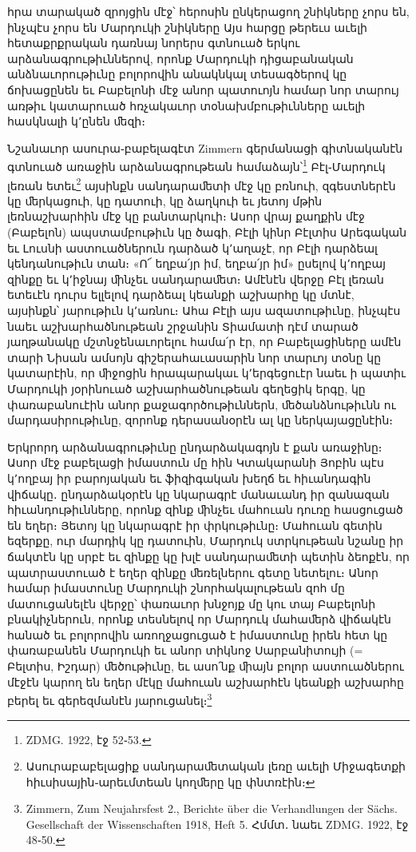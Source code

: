 \documentclass{article}
\begin{document}
{հրա տարակած զրոյցին մէջ՝ հերոսին ընկերացող շնիկները չորս են, ինչպէս չորս են Մարդուկի շնիկները Այս հարցը թերեւս աւելի հետաքրքրական դառնայ նորերս գտնուած երկու արձանագրութիւններով, որոնք Մարդուկի դիցաբանական անձնաւորութիւնը բոլորովին անակնկալ տեսագծերով կը ճոխացընեն եւ Բաբելոնի մէջ անոր պատուոյն համար նոր տարույ առթիւ կատարուած հռչակաւոր տօնախմբութիւնները աւելի հասկնալի կ՚ընեն ﬔզի։

Նշանաւոր ասուրա֊բաբելագէտ Zimmern գերմանացի գիտնականէն գտնուած առաջին արձանագրութեան համաձայն՝\footnote{ZDMG. 1922, էջ 52֊53.} Բէլ֊Մարդուկ լեռան ետեւ\footnote{Ասուրաբաբելացիք սանդարաﬔտական լեռը աւելի Միջագետքի հիւսիսային֊արեւմտեան կողﬔրը կը փնտռէին։} այսինքն սանդարաﬔտի մէջ կը բռնուի, զգեստներէն կը ﬔրկացուի, կը դատուի, կը ձաղկուի եւ յետոյ մթին լեռնաշխարհին մէջ կը բանտարկուի։ Ասոր վրայ քաղքին մէջ (Բաբելոն) ապստամբութիւն կը ծագի, Բէլի կինր Բէլտիս Արեգական եւ Լուսնի աստուածներուն դարձած կ՚աղաչէ, որ Բէլի դարձեալ կենդանութիւն տան։ «Ո՜ եղբա՛յր իմ, եղբա՛յր իմ» ըսելով կ՚ողբայ զինքը եւ կ՚իջնայ ﬕնչեւ սանդարաﬔտ։ Ամէնէն վերջը Բէլ լեռան ետեւէն դուրս ելլելով դարձեալ կեանքի աշխարհը կը մտնէ, այսինքն՝ յարութիւն կ՚առնու։ Ահա Բէլի այս ազատութիւնը, ինչպէս նաեւ աշխարհածնութեան շրջանին Տիամատի դէմ տարած յաղթանակը մշտնջենաւորելու համա՛ր էր, որ Բաբելացիները ամէն տարի Նիսան ամսոյն գիշերահաւասարին նոր տարւոյ տօնը կը կատարէին, որ ﬕջոցին հրապարակաւ կ՚երգեցուէր նաեւ ի պատիւ Մարդուկի յօրինուած աշխարհածնութեան գեղեցիկ երգը, կը փառաբանուէին անոր քաջագործութիւններն, ﬔծանձնութիւնն ու մարդասիրութիւնը, զորոնք դերասանօրէն ալ կը ներկայացընէին։

Երկրորդ արձանագրութիւնը ընդարձակագոյն է քան առաջինը։ Ասոր մէջ բաբելացի իմաստուն մը հին Կտակարանի Յոբին պէս կ՚ողբայ իր բարոյական եւ ֆիզիգական խեղճ եւ հիւանդագին վիճակը․ ընդարձակօրէն կը նկարագրէ մանաւանդ իր զանազան հիւանդութիւնները, որոնք զինք ﬕնչեւ մահուան դուռը հասցուցած են եղեր։ Յետոյ կը նկարագրէ իր փրկութիւնը։ Մահուան գետին եզերքը, ուր մարդիկ կը դատուին, Մարդուկ ստրկութեան նշանը իր ճակտէն կը սրբէ եւ զինքը կը խլէ սանդարաﬔտի պետին ձեոքէն, որ պատրաստուած է եղեր զինքը ﬔռելներու գետը նետելու։ Անոր համար իմաստունը Մարդուկի շնորհակալութեան զոհ մը մատուցանելէն վերջը՝ փառաւոր խնջոյք մը կու տայ Բաբելոնի բնակիչներուն, որոնք տեսնելով որ Մարդուկ մահաﬔրձ վիճակէն հանած եւ բոլորովին առողջացուցած է իմաստունը իրեն հետ կը փառաբանեն Մարդուկի եւ անոր տիկնոջ Սարբանիտույի (= Բելտիս, Իշդար) ﬔծութիւնը, եւ ասո՛նք ﬕայն բոլոր աստուածներու մէջէն կարող են եղեր մէկը մահուան աշխարհէն կեանքի աշխարհը բերել եւ գերեզմանէն յարուցանել։\footnote{Zimmern, Zum Neujahrsfest 2., Berichte über die Verhandlungen der Sächs. Gesellschaft der Wissenschaften 1918, Heft 5. Հմմտ․ նաեւ ZDMG. 1922, էջ 48֊50.}

}
\end{document}
